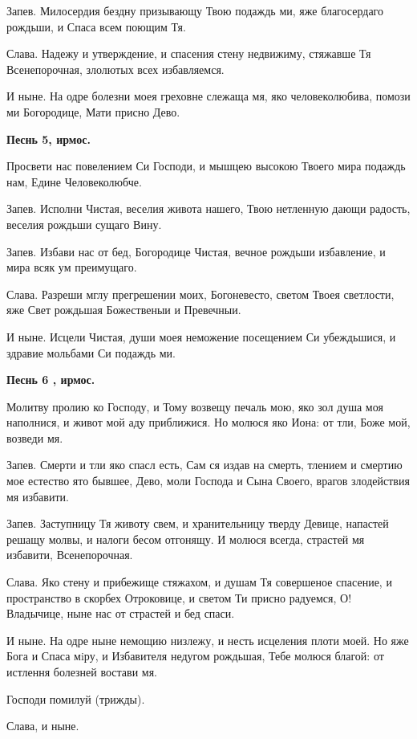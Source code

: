 Запев. Милосердия бездну призывающу Твою подаждь ми, яже благосердаго рождьши, и Спаса всем поющим Тя.

Слава. Надежу и утверждение, и спасения стену недвижиму, стяжавше Тя Всенепорочная, злолютых всех избавляемся.

И ныне. На одре болезни моея греховне слежаща мя, яко человеколюбива, помози ми Богородице, Мати присно Дево.


\medskip


\bfseries Песнь 5, ирмос.\normalfont{}


Просвети нас повелением Си Господи, и мышцею высокою Твоего мира подаждь нам, Едине Человеколюбче.

Запев. Исполни Чистая, веселия живота нашего, Твою нетленную дающи радость, веселия рождьши сущаго Вину.

Запев. Избави нас от бед, Богородице Чистая, вечное рождьши избавление, и мира всяк ум преимущаго.

Слава. Разреши мглу прегрешении моих, Богоневесто, светом Твоея светлости, яже Свет рождьшая Божественыи и Превечныи.

И ныне. Исцели Чистая, души моея неможение посещением Си убеждьшися, и здравие мольбами Си подаждь ми.


\medskip


\bfseries Песнь 6 , ирмос.\normalfont{}


Молитву пролию ко Господу, и Тому возвещу печаль мою, яко зол душа моя наполнися, и живот мой аду приближися. Но молюся яко Иона: от тли, Боже мой, возведи мя.

Запев. Смерти и тли яко спасл есть, Сам ся издав на смерть, тлением и смертию мое естество ято бывшее, Дево, моли Господа и Сына Своего, врагов злодействия мя избавити.

Запев. Заступницу Тя животу свем, и хранительницу тверду Девице, напастей решащу молвы, и налоги бесом отгонящу. И молюся всегда, страстей мя избавити, Всенепорочная.

Слава. Яко стену и прибежище стяжахом, и душам Тя совершеное спасение, и пространство в скорбех Отроковице, и светом Ти присно радуемся, О! Владычице, ныне нас от страстей и бед спаси.

И ныне. На одре ныне немощию низлежу, и несть исцеления плоти моей. Но яже Бога и Спаса мiру, и Избавителя недугом рождьшая, Тебе молюся благой: от истлення болезней востави мя.

Господи помилуй (трижды). 

Слава, и ныне.



